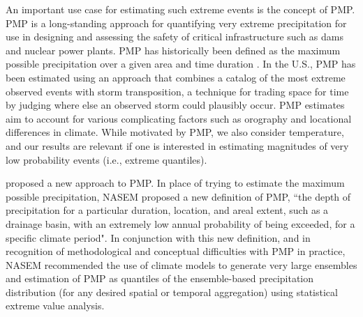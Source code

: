 \documentclass{ametsocV6.1}
\begin{document}
An important use case for estimating such extreme events is the concept of PMP. PMP is a long-standing approach for quantifying very extreme precipitation for use in designing and assessing the safety of critical infrastructure such as dams and nuclear power plants. %
PMP has historically been defined as the maximum possible precipitation over a given area and time duration \citep{nasem2024pmp}.
In the U.S., PMP has been estimated using an approach that combines %
a catalog of the most extreme observed events with storm transposition, a technique for trading space for time by judging where else an observed storm could plausibly occur.
PMP estimates aim to account for various complicating factors such as orography and locational differences in climate. 
While motivated by PMP, we also consider temperature, and our results are relevant if one is interested in estimating magnitudes of very low probability events (i.e., extreme quantiles).

\cite{nasem2024pmp} proposed a new approach to PMP. 
In place of trying to estimate the maximum possible precipitation, NASEM proposed a new definition of PMP, ``the depth of precipitation for a particular duration, location, and areal extent, such as a drainage basin, with an extremely low annual probability of being exceeded, for a specific climate period".   
In conjunction with this new definition, and in recognition of methodological and conceptual difficulties with PMP in practice, NASEM recommended the use of climate models
to generate very large ensembles and estimation of PMP as quantiles of the ensemble-based precipitation distribution (for any desired spatial or temporal aggregation) using statistical extreme value analysis. 
\end{document}
